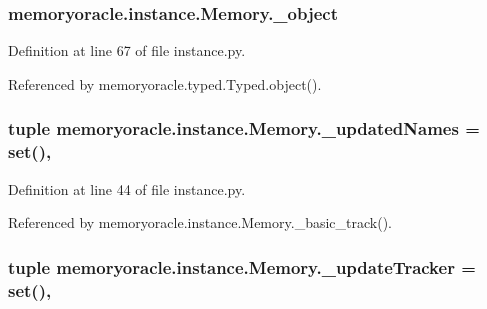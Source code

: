 \hypertarget{classmemoryoracle_1_1instance_1_1Memory_a7359656d1a81dddfe450381200b44e80}{}
\subsubsection[{\+\_\+object}]{\setlength{\rightskip}{0pt plus 5cm}memoryoracle.\+instance.\+Memory.\+\_\+object\hspace{0.3cm}{\ttfamily [private]}}\label{classmemoryoracle_1_1instance_1_1Memory_a7359656d1a81dddfe450381200b44e80}


Definition at line 67 of file instance.\+py.



Referenced by memoryoracle.\+typed.\+Typed.\+object().

\hypertarget{classmemoryoracle_1_1instance_1_1Memory_a2ac9f507ee9de1420f11982237450ecb}{}
\subsubsection[{\+\_\+updated\+Names}]{\setlength{\rightskip}{0pt plus 5cm}tuple memoryoracle.\+instance.\+Memory.\+\_\+updated\+Names = set()\hspace{0.3cm}{\ttfamily [static]}, {\ttfamily [private]}}\label{classmemoryoracle_1_1instance_1_1Memory_a2ac9f507ee9de1420f11982237450ecb}


Definition at line 44 of file instance.\+py.



Referenced by memoryoracle.\+instance.\+Memory.\+\_\+basic\+\_\+track().

\hypertarget{classmemoryoracle_1_1instance_1_1Memory_abfe5ff52d9fa0a5b99fff473df6b4d8b}{}
\subsubsection[{\+\_\+update\+Tracker}]{\setlength{\rightskip}{0pt plus 5cm}tuple memoryoracle.\+instance.\+Memory.\+\_\+update\+Tracker = set()\hspace{0.3cm}{\ttfamily [static]}, {\ttfamily [private]}}\label{classmemoryoracle_1_1instance_1_1Memory_abfe5ff52d9fa0a5b99fff473df6b4d8b}


